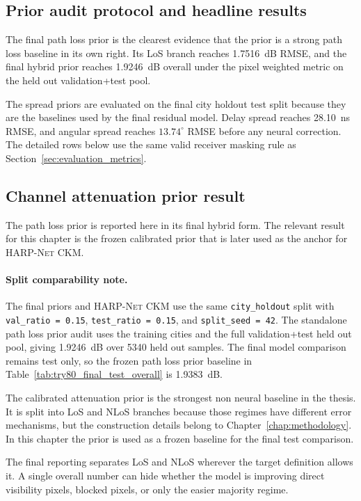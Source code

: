 \subsection{Prior audit protocol and headline results}

The final path loss prior is the clearest evidence that the prior is a strong
path loss baseline in its own right. Its LoS branch reaches
\SI{1.7516}{dB} RMSE, and the final hybrid prior reaches
\SI{1.9246}{dB} overall under the pixel weighted metric on the held out
validation+test pool.

The spread priors are evaluated on the final city holdout test split because
they are the baselines used by the final residual model. Delay spread reaches
\SI{28.10}{ns} RMSE, and angular spread reaches \(13.74^\circ\) RMSE before
any neural correction. The detailed rows below use the same valid receiver
masking rule as Section~\ref{sec:evaluation_metrics}.

\subsection{Channel attenuation prior result}

The path loss prior is reported here in its final hybrid form. The relevant
result for this chapter is the frozen calibrated prior that is later used as
the anchor for \textsc{HARP-Net CKM}.

\paragraph{Split comparability note.}
The final priors and \textsc{HARP-Net CKM} use the same \texttt{city\_holdout}
split with \texttt{val\_ratio = 0.15}, \texttt{test\_ratio = 0.15}, and
\texttt{split\_seed = 42}. The standalone path loss prior audit uses the
training cities and the full validation+test held out pool, giving
\SI{1.9246}{dB} over 5340 held out samples. The final model comparison remains
test only, so the frozen path loss prior baseline in
Table~\ref{tab:try80_final_test_overall} is \SI{1.9383}{dB}.

The calibrated attenuation prior is the strongest non neural baseline in the
thesis. It is split into LoS and NLoS branches because those regimes have
different error mechanisms, but the construction details belong to
Chapter~\ref{chap:methodology}. In this chapter the prior is used as a frozen
baseline for the final test comparison.

The final reporting separates LoS and NLoS wherever the target definition
allows it. A single overall number can hide whether the model is improving
direct visibility pixels, blocked pixels, or only the easier majority regime.

